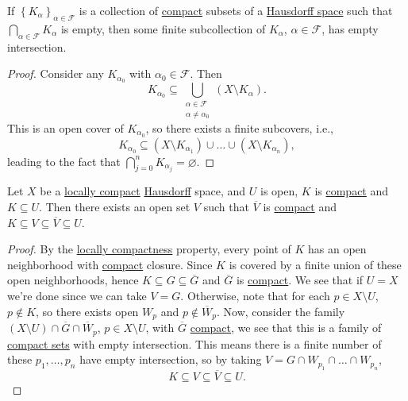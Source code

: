 \begin{theorem}
	If \(\left\{ K_\alpha  \right\}_{\alpha \in \mathcal{F} } \) is a collection of \hyperref[def:compact]{compact} subsets of a \hyperref[def:Hausdorff]{Hausdorff space} such that \(\bigcap_{\alpha \in \mathcal{F} } K_\alpha \) is empty, then some finite subcollection of \(K_\alpha \), \(\alpha \in \mathcal{F} \), has empty intersection.
\end{theorem}
\begin{proof}
	Consider any \(K_{\alpha_0} \) with \(\alpha _0\in \mathcal{F} \). Then
	\[
		K_{\alpha _0} \subseteq \bigcup_{\substack{\alpha \in \mathcal{F} \\ \alpha \neq \alpha _0}} (X\setminus K_\alpha ).
	\]
	This is an open cover of \(K_{\alpha _0}\), so there exists a finite subcovers, i.e.,
	\[
		K_{\alpha _0} \subseteq (X \setminus K_{\alpha _1}) \cup \ldots \cup (X \setminus K_{\alpha _n}),
	\]
	leading to the fact that \(\bigcap_{j=0}^{n} K_{\alpha _j} = \varnothing \).
\end{proof}

\begin{theorem}\label{thm:open-between-compact}
	Let \(X\) be a \hyperref[def:locally-compact]{locally compact} \hyperref[def:Hausdorff]{Hausdorff} space, and \(U\) is open, \(K\) is \hyperref[def:compact]{compact} and \(K \subseteq U\). Then there exists an open set \(V\) such that \(\overline{V} \) is \hyperref[def:compact]{compact} and \(K \subseteq V \subseteq \overline{V} \subseteq U\).
\end{theorem}
\begin{proof}
	By the \hyperref[def:locally-compact]{locally compactness} property, every point of \(K\) has an open neighborhood with \hyperref[def:compact]{compact} closure. Since \(K\) is covered by a finite union of these open neighborhoods, hence \(K \subseteq G \subseteq \overline{G} \) and \(\overline{G} \) is \hyperref[def:compact]{compact}. We see that if \(U = X\) we're done since we can take \(V = G\). Otherwise, note that for each \(p\in X \setminus U\), \(p\notin K\), so there exists open \(W_p\) and \(p \notin \overline{W} _p\). Now, consider the family \((X \setminus U) \cap \overline{G} \cap \overline{W} _p\), \(p\in X\setminus U\), with \(\overline{G} \) \hyperref[def:compact]{compact}, we see that this is a family of \hyperref[def:compact]{compact sets} with empty intersection. This means there is a finite number of these \(p_1, \ldots  , p_n\) have empty intersection, so by taking \(V = G \cap W_{p_1} \cap \ldots  \cap W_{p_n}\),
	\[
		K \subseteq V \subseteq \overline{V} \subseteq U.
	\]
\end{proof}


